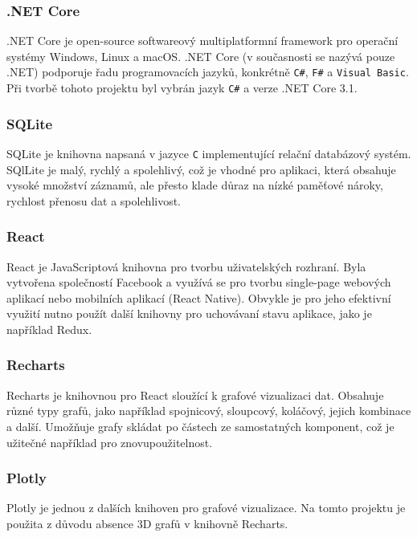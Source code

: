 \documentclass[czech,master,dept460,male,cpp,cpdeclaration,oneside]{diploma}
\begin{document}
\subsubsection*{.NET Core}
.NET Core\autocite{NETCORE} je open-source softwareový multiplatformní framework pro operační systémy Windows, Linux a macOS. .NET Core (v současnosti se nazývá pouze .NET) podporuje řadu programovacích jazyků, konkrétně \texttt{C\#}, \texttt{F\#} a \texttt{Visual Basic}. Při tvorbě tohoto projektu byl vybrán jazyk \texttt{C\#} a verze .NET Core 3.1.

\subsubsection*{SQLite}
SQLite\autocite{SQLite} je knihovna napsaná v jazyce \texttt{C} implementující relační databázový systém. SQlLite je malý, rychlý a spolehlivý, což je vhodné pro aplikaci, která obsahuje vysoké množství záznamů, ale přesto klade důraz na nízké paměťové nároky, rychlost přenosu dat a spolehlivost.

\subsubsection*{React}
React\autocite{React} je JavaScriptová knihovna pro tvorbu uživatelských rozhraní. Byla vytvořena společností Facebook a využívá se pro tvorbu single-page webových aplikací nebo mobilních aplikací (React Native). Obvykle je pro jeho efektivní využití nutno použít další knihovny pro uchovávaní stavu aplikace, jako je například Redux. 

\clearpage

\subsubsection*{Recharts}
Recharts\autocite{Recharts} je knihovnou pro React sloužící k grafové vizualizaci dat. Obsahuje různé typy grafů, jako například spojnicový, sloupcový, koláčový, jejich kombinace a další. Umožňuje grafy skládat po částech ze samostatných komponent, což je užitečné například pro znovupoužitelnost.

\subsubsection*{Plotly}
Plotly\autocite{Plotly} je jednou z dalších knihoven pro grafové vizualizace. Na tomto projektu je použita z důvodu absence 3D grafů v knihovně Recharts.
\end{document}
